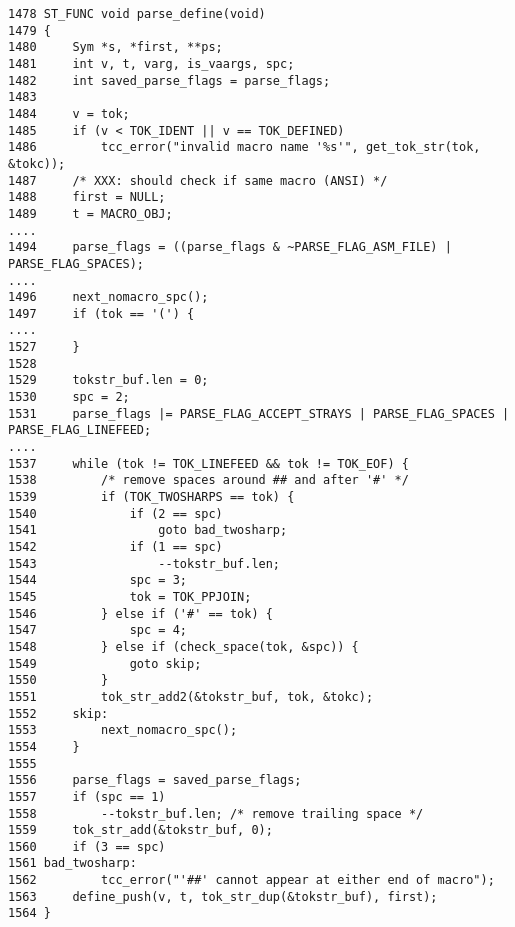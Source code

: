 %
% 




\begin{verbatim}
1478 ST_FUNC void parse_define(void)
1479 {
1480     Sym *s, *first, **ps;
1481     int v, t, varg, is_vaargs, spc;
1482     int saved_parse_flags = parse_flags;
1483
1484     v = tok;
1485     if (v < TOK_IDENT || v == TOK_DEFINED)
1486         tcc_error("invalid macro name '%s'", get_tok_str(tok, &tokc));
1487     /* XXX: should check if same macro (ANSI) */
1488     first = NULL;
1489     t = MACRO_OBJ;
....    
1494     parse_flags = ((parse_flags & ~PARSE_FLAG_ASM_FILE) | PARSE_FLAG_SPACES);
....    
1496     next_nomacro_spc();
1497     if (tok == '(') {
....
1527     }
1528
1529     tokstr_buf.len = 0;
1530     spc = 2;
1531     parse_flags |= PARSE_FLAG_ACCEPT_STRAYS | PARSE_FLAG_SPACES | PARSE_FLAG_LINEFEED;
....
1537     while (tok != TOK_LINEFEED && tok != TOK_EOF) {
1538         /* remove spaces around ## and after '#' */
1539         if (TOK_TWOSHARPS == tok) {
1540             if (2 == spc)
1541                 goto bad_twosharp;
1542             if (1 == spc)
1543                 --tokstr_buf.len;
1544             spc = 3;
1545             tok = TOK_PPJOIN;
1546         } else if ('#' == tok) {
1547             spc = 4;
1548         } else if (check_space(tok, &spc)) {
1549             goto skip;
1550         }
1551         tok_str_add2(&tokstr_buf, tok, &tokc);
1552     skip:
1553         next_nomacro_spc();
1554     }
1555
1556     parse_flags = saved_parse_flags;
1557     if (spc == 1)
1558         --tokstr_buf.len; /* remove trailing space */
1559     tok_str_add(&tokstr_buf, 0);
1560     if (3 == spc)
1561 bad_twosharp:
1562         tcc_error("'##' cannot appear at either end of macro");
1563     define_push(v, t, tok_str_dup(&tokstr_buf), first);
1564 }
\end{verbatim}



